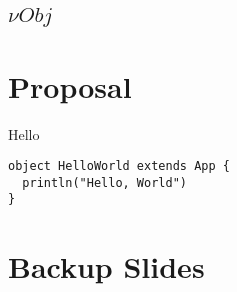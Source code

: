\documentclass{beamer}
\begin{document}
\subsection{${\nu}Obj$}

\section{Proposal}

\begin{frame}[fragile]{Hello}
\begin{verbatim}
object HelloWorld extends App {
  println("Hello, World")
}
\end{verbatim}
\end{frame}

\section{Backup Slides}

\end{document}
